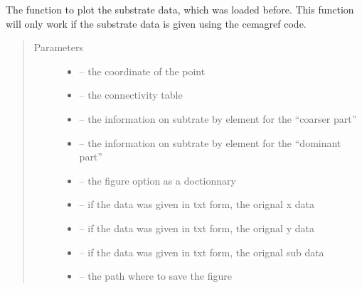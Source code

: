 \documentclass[letterpaper,10pt,english]{sphinxmanual}
\begin{document}
\begin{fulllineitems}
\label{\detokenize{index:src.substrate.fig_substrate}}
The function to plot the substrate data, which was loaded before. This function will only work if the substrate
data is given using the cemagref code.
\begin{quote}\begin{description}
\item[{Parameters}] \leavevmode\begin{itemize}
\item {} 
 -- the coordinate of the point

\item {} 
 -- the connectivity table

\item {} 
 -- the information on subtrate by element for the ``coarser part''

\item {} 
 -- the information on subtrate by element for the ``dominant part''

\item {} 
 -- the figure option as a doctionnary

\item {} 
 -- if the data was given in txt form, the orignal x data

\item {} 
 -- if the data was given in txt form, the orignal y data

\item {} 
 -- if the data was given in txt form, the orignal sub data

\item {} 
 -- the path where to save the figure

\end{itemize}

\end{description}\end{quote}

\end{fulllineitems}
\end{document}
